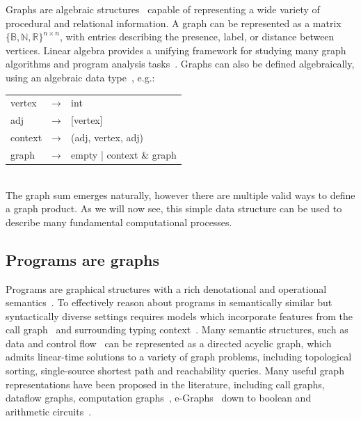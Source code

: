 \documentclass[11pt]{article}
\begin{document}
    Graphs are algebraic structures~\cite{weisfeiler1968reduction} capable of representing a wide variety of procedural and relational information. A graph can be represented as a matrix $\{\mathbb{B}, \mathbb{N}, \mathbb{R}\}^{n\times n}$, with entries describing the presence, label, or distance between vertices. Linear algebra provides a unifying framework for studying many graph algorithms and program analysis tasks~\citep{kepner2011graph}. Graphs can also be defined algebraically, using an algebraic data type~\cite{erwig2001inductive, mokhov2017algebraic}, e.g.:\\

    \hspace{2.2cm}\begin{minipage}[c]{0.5\textwidth}
        \centering
        \begin{tabular}{lcl}
            vertex  & → & int \\
            adj     & → & [vertex] \\
            context & → & (adj, vertex, adj) \\
            graph   & → & empty | context \& graph \\
        \end{tabular}
    \end{minipage}\\


    The graph sum emerges naturally, however there are multiple valid ways to define a graph product. As we will now see, this simple data structure can be used to describe many fundamental computational processes.


    \subsection{Programs are graphs}\label{sec:program-graphs}

    Programs are graphical structures with a rich denotational and operational semantics~\cite{henkel2018code}. To effectively reason about programs in semantically similar but syntactically diverse settings requires models which incorporate features from the call graph~\cite{liu2019neural} and surrounding typing context~\cite{allamanis2017learning}. Many semantic structures, such as data and control flow~\cite{si2018learning} can be represented as a directed acyclic graph, which admits linear-time solutions to a variety of graph problems, including topological sorting, single-source shortest path and reachability queries. Many useful graph representations have been proposed in the literature, including call graphs, dataflow graphs, computation graphs~\citep{breuleux2017automatic}, e-Graphs~\citep{willsey2020egg} down to boolean and arithmetic circuits~\citep{miller1988efficient}.
\end{document}
